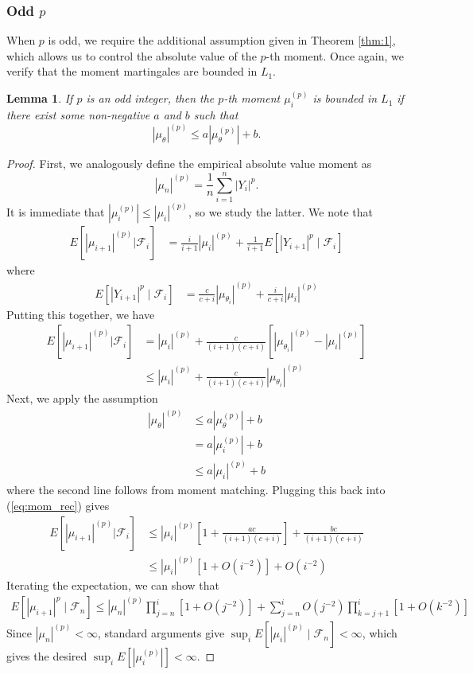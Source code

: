 \documentclass[11pt,a4paper]{article}
\theoremstyle{plain}
\newtheorem{lemma}{Lemma}
\theoremstyle{remark}
\theoremstyle{remark}
\begin{document}
\subsubsection{Odd $p$}
When $p$ is odd, we require the additional assumption given in Theorem \ref{thm:1}, which allows us to control the absolute value of the $p$-th moment. Once again, we verify that the moment martingales are bounded in $L_1$.
\begin{lemma}\label{lem:oddp} If $p$ is an odd integer,  then the $p$-th moment $\mu_i^{(p)}$ is bounded in $L_1$ if there exist some non-negative $a$ and $b$ such that
    $$|\mu_\theta|^{(p)} \leq a|\mu^{(p)}_\theta |+ b.$$
\end{lemma}
\begin{proof}
First, we analogously define the empirical absolute value moment as
$$
|\mu_n|^{(p)} = \frac{1}{n}\sum_{i = 1}^n |Y_i|^p.
$$
It is immediate that $|\mu_i^{(p)}| \leq |\mu_i|^{(p)}$, so we study the latter. We note that
\begin{align*}
        E\left[|\mu_{i+1}|^{(p)}\Big|\mathcal{F}_{i}\right] 
        &= \frac{i}{i+1} |\mu_i|^{(p)}+ \frac{1}{i+1} E\left[|Y_{i+1}|^{p} \mid \mathcal{F}_{i}\right] %
        \end{align*}
        where
        \begin{align*}
    E\left[|Y_{i+1}|^{p} \mid \mathcal{F}_{i}\right] &=\frac{c}{c+i}|\mu_{\theta_i}|^{(p)} + \frac{i}{c+i}|\mu_i|^{(p)} 
    \end{align*}
    Putting this together, we have
    \begin{align}\label{eq:mom_rec}
        E\left[|\mu_{i+1}|^{(p)}\Big|\mathcal{F}_{i}\right] &= |\mu_i|^{(p)} + \frac{c}{(i+1)(c+i)}\left[|\mu_{\theta_i}|^{(p)} - |\mu_i|^{(p)}\right] \nonumber\\
        &\leq |\mu_i|^{(p)} + \frac{c}{(i+1)(c+i)}|\mu_{\theta_i}|^{(p)} 
    \end{align}
Next, we apply the assumption 
\begin{align*}
    |\mu_\theta|^{(p)} &\leq a|\mu^{(p)}_\theta| + b  \\
    &=a|\mu^{(p)}_i|  + b\\
    &\leq a|\mu_i|^{(p)} + b
\end{align*}
where the second line follows from moment matching. Plugging this back into (\ref{eq:mom_rec}) gives
\begin{align*}
      E\left[|\mu_{i+1}|^{(p)}\Big|\mathcal{F}_{i}\right] 
        &\leq |\mu_i|^{(p)} \left[ 1 + \frac{ac}{(i+1)(c+i)}\right] + \frac{bc}{(i+1)(c+i)}\\
         &\leq |\mu_i|^{(p)} \left[ 1 + O(i^{-2})\right] + O(i^{-2})
\end{align*}
Iterating the expectation, we can show that
\begin{align*}
    E\left[|\mu_{i+1}|^{p}\mid \mathcal{F}_n\right] \leq |\mu_n|^{(p)}\prod_{j = n}^i \left[1 + O(j^{-2})\right] + \sum_{j = n}^i O(j^{-2})\prod_{k = j+1}^{i} \left[1 + O(k^{-2})\right]
    \end{align*}
Since $|\mu_n|^{(p)} < \infty$, standard arguments give $\sup_i E\left[|\mu_i|^{(p)} \mid \mathcal{F}_n\right] < \infty$, which gives the desired $\sup_i E\left[|\mu_i^{(p)}|\right] < \infty$.
\end{proof}
\end{document}
